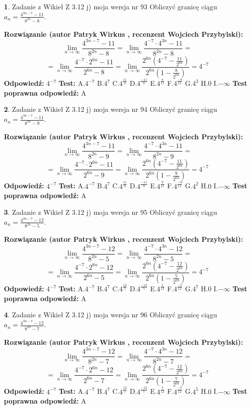 \documentclass[12pt, a4paper]{article}
\theoremstyle{definition} %
\newtheorem{zad}{}
\newcommand{\zadStart}[1]{\begin{zad}#1\newline}
\newcommand{\zadStop}{\end{zad}}
\newcommand{\rozwStart}[2]{\noindent \textbf{Rozwiązanie (autor #1 , recenzent #2): }\newline}
\newcommand{\rozwStop}{\newline}
\newcommand{\odpStart}{\noindent \textbf{Odpowiedź:}\newline}
\newcommand{\odpStop}{\newline}
\newcommand{\testStart}{\noindent \textbf{Test:}\newline}
\newcommand{\testStop}{\newline}
\newcommand{\kluczStart}{\noindent \textbf{Test poprawna odpowiedź:}\newline}
\newcommand{\kluczStop}{\newline}
\begin{document}
\zadStart{Zadanie z Wikieł Z 3.12 j) moja wersja nr 93}
Obliczyć granicę ciągu $a_{n}=\frac{4^{3n-7}-11}{8^{2n}-8}$.
\zadStop
\rozwStart{Patryk Wirkus}{Wojciech Przybylski}
$$\lim\limits_{n\to\infty}\frac{4^{3n-7}-11}{8^{2n}-8}= \lim\limits_{n\to\infty}\frac{4^{-7} \cdot 4^{3n}-11}{8^{2n}-8}=$$
$$= \lim\limits_{n\to\infty}\frac{4^{-7} \cdot 2^{6n}-11}{2^{6n}-8}= \lim\limits_{n\to\infty}\frac{2^{6n}(4^{-7} - \frac{11}{2^{6n}})}{2^{6n}(1-\frac{8}{2^{6n}})}= 4^{-7}$$
\rozwStop
\odpStart
$4^{-7}$
\odpStop
\testStart
A.$4^{-7}$
B.$4^{7}$
C.$4^{\frac{11}{8}}$
D.$4^{\frac{-11}{8}}$
E.$4^{\frac{8}{11}}$
F.$4^{\frac{-8}{11}}$
G.$4^{3}$
H.$0$
I.$-\infty$
\testStop
\kluczStart
A
\kluczStop



\zadStart{Zadanie z Wikieł Z 3.12 j) moja wersja nr 94}
Obliczyć granicę ciągu $a_{n}=\frac{4^{3n-7}-11}{8^{2n}-9}$.
\zadStop
\rozwStart{Patryk Wirkus}{Wojciech Przybylski}
$$\lim\limits_{n\to\infty}\frac{4^{3n-7}-11}{8^{2n}-9}= \lim\limits_{n\to\infty}\frac{4^{-7} \cdot 4^{3n}-11}{8^{2n}-9}=$$
$$= \lim\limits_{n\to\infty}\frac{4^{-7} \cdot 2^{6n}-11}{2^{6n}-9}= \lim\limits_{n\to\infty}\frac{2^{6n}(4^{-7} - \frac{11}{2^{6n}})}{2^{6n}(1-\frac{9}{2^{6n}})}= 4^{-7}$$
\rozwStop
\odpStart
$4^{-7}$
\odpStop
\testStart
A.$4^{-7}$
B.$4^{7}$
C.$4^{\frac{11}{9}}$
D.$4^{\frac{-11}{9}}$
E.$4^{\frac{9}{11}}$
F.$4^{\frac{-9}{11}}$
G.$4^{2}$
H.$0$
I.$-\infty$
\testStop
\kluczStart
A
\kluczStop



\zadStart{Zadanie z Wikieł Z 3.12 j) moja wersja nr 95}
Obliczyć granicę ciągu $a_{n}=\frac{4^{3n-7}-12}{8^{2n}-5}$.
\zadStop
\rozwStart{Patryk Wirkus}{Wojciech Przybylski}
$$\lim\limits_{n\to\infty}\frac{4^{3n-7}-12}{8^{2n}-5}= \lim\limits_{n\to\infty}\frac{4^{-7} \cdot 4^{3n}-12}{8^{2n}-5}=$$
$$= \lim\limits_{n\to\infty}\frac{4^{-7} \cdot 2^{6n}-12}{2^{6n}-5}= \lim\limits_{n\to\infty}\frac{2^{6n}(4^{-7} - \frac{12}{2^{6n}})}{2^{6n}(1-\frac{5}{2^{6n}})}= 4^{-7}$$
\rozwStop
\odpStart
$4^{-7}$
\odpStop
\testStart
A.$4^{-7}$
B.$4^{7}$
C.$4^{\frac{12}{5}}$
D.$4^{\frac{-12}{5}}$
E.$4^{\frac{5}{12}}$
F.$4^{\frac{-5}{12}}$
G.$4^{7}$
H.$0$
I.$-\infty$
\testStop
\kluczStart
A
\kluczStop



\zadStart{Zadanie z Wikieł Z 3.12 j) moja wersja nr 96}
Obliczyć granicę ciągu $a_{n}=\frac{4^{3n-7}-12}{8^{2n}-7}$.
\zadStop
\rozwStart{Patryk Wirkus}{Wojciech Przybylski}
$$\lim\limits_{n\to\infty}\frac{4^{3n-7}-12}{8^{2n}-7}= \lim\limits_{n\to\infty}\frac{4^{-7} \cdot 4^{3n}-12}{8^{2n}-7}=$$
$$= \lim\limits_{n\to\infty}\frac{4^{-7} \cdot 2^{6n}-12}{2^{6n}-7}= \lim\limits_{n\to\infty}\frac{2^{6n}(4^{-7} - \frac{12}{2^{6n}})}{2^{6n}(1-\frac{7}{2^{6n}})}= 4^{-7}$$
\rozwStop
\odpStart
$4^{-7}$
\odpStop
\testStart
A.$4^{-7}$
B.$4^{7}$
C.$4^{\frac{12}{7}}$
D.$4^{\frac{-12}{7}}$
E.$4^{\frac{7}{12}}$
F.$4^{\frac{-7}{12}}$
G.$4^{5}$
H.$0$
I.$-\infty$
\testStop
\kluczStart
A
\kluczStop
\end{document}
